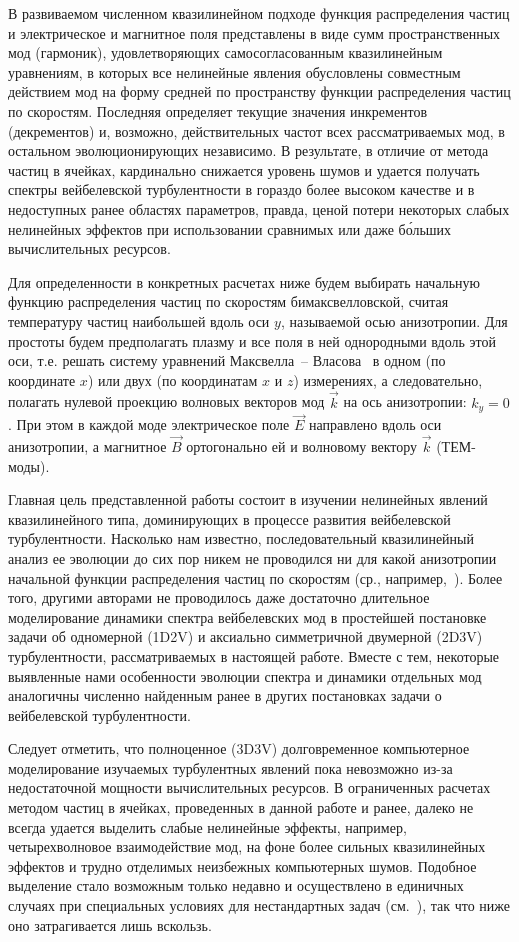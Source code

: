 В развиваемом численном квазилинейном подходе функция распределения частиц и электрическое и магнитное поля представлены в виде сумм пространственных мод (гармоник), удовлетворяющих самосогласованным квазилинейным уравнениям, в которых все нелинейные явления обусловлены совместным действием мод на форму средней по пространству функции распределения частиц по скоростям. Последняя определяет текущие значения инкрементов (декрементов) и, возможно, действительных частот всех рассматриваемых мод, в остальном эволюционирующих независимо. В результате, в отличие от метода частиц в ячейках, кардинально снижается уровень шумов и удается получать спектры вейбелевской турбулентности в гораздо более высоком качестве и в недоступных ранее областях параметров, правда, ценой потери некоторых слабых нелинейных эффектов при использовании сравнимых или даже б\'{о}льших вычислительных ресурсов.

Для определенности в конкретных расчетах ниже будем выбирать начальную функцию распределения частиц по скоростям бимаксвелловской, считая температуру частиц наибольшей вдоль оси $y$, называемой осью анизотропии. Для простоты будем предполагать плазму и все поля в ней однородными вдоль этой оси, т.е. решать систему уравнений Максвелла~-- Власова~\cite{Baumjohann2012} в одном (по координате $x$) или двух (по координатам $x$ и $z$) измерениях, а следовательно, полагать нулевой проекцию волновых векторов мод $\vec{k}$ на ось анизотропии: $k_y=0$. При этом в каждой моде электрическое поле $\vec{E}$ направлено вдоль оси анизотропии, а магнитное $\vec{B}$ ортогонально ей и волновому вектору $\vec{k}$ (ТЕМ-моды). 

Главная цель представленной работы состоит в изучении нелинейных явлений квазилинейного типа, доминирующих в процессе развития вейбелевской турбулентности. Насколько нам известно, последовательный квазилинейный анализ ее эволюции до сих пор никем не проводился ни для какой анизотропии начальной функции распределения частиц по скоростям (ср., например,~\cite{Ruyer2015,Pokhotelov2011,Davidson1972}). Более того, другими авторами не проводилось даже достаточно длительное моделирование динамики спектра вейбелевских мод в простейшей постановке задачи об одномерной (1D2V) и аксиально симметричной двумерной (2D3V) турбулентности, рассматриваемых в настоящей работе. Вместе с тем, некоторые выявленные нами особенности эволюции спектра и динамики отдельных мод аналогичны численно найденным ранее в других постановках задачи о вейбелевской турбулентности.

Следует отметить, что полноценное (3D3V) долговременное компьютерное моделирование изучаемых турбулентных явлений пока невозможно из-за недостаточной мощности вычислительных ресурсов. В ограниченных расчетах методом частиц в ячейках, проведенных в данной работе и ранее, далеко не всегда удается выделить слабые нелинейные эффекты, например, четырехволновое взаимодействие мод, на фоне более сильных квазилинейных эффектов и трудно отделимых неизбежных компьютерных шумов. Подобное выделение стало возможным только недавно и осуществлено в единичных случаях при специальных условиях для нестандартных задач (см.~\cite{Garasev2017_Radiophys,Garasev2021}), так что ниже оно затрагивается лишь вскользь.
